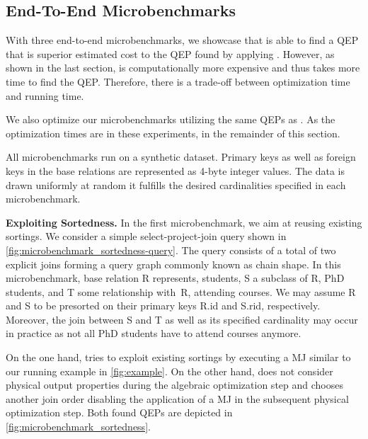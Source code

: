 \subsection{End-To-End Microbenchmarks}
\label{sec:eval-microbenchmarks}

With three end-to-end microbenchmarks, we showcase that \holistic is able to find a QEP that is superior \wrt estimated cost to the QEP found by applying \split.  However, as shown in the last section, \holistic is computationally more expensive and thus takes more time to find the QEP.  Therefore, there is a trade-off between optimization time and running time.

We also optimize our microbenchmarks utilizing   the same QEPs as \holistic.  As the optimization times are  in these experiments,  in the remainder of this section.

All microbenchmarks run on a synthetic dataset.  Primary keys as well as foreign keys in the base relations are represented as 4-byte integer values.  The data is drawn uniformly at random \sut it fulfills the desired cardinalities specified in each microbenchmark.

\textbf{Exploiting Sortedness.}
In the first microbenchmark, we aim at reusing existing sortings.  We consider a simple select-project-join query shown in \autoref{fig:microbenchmark_sortedness-query}.  The query consists of a total of two explicit joins forming a query graph commonly known as chain shape.  In this microbenchmark, base relation R represents, \eg students, S a subclass of R, \eg PhD students, and T some relationship with~R, \eg attending courses.  We may assume R and S to be presorted on their primary keys R.id and S.rid, respectively.  Moreover, the join between S and T as well as its specified cardinality may occur in practice as not all PhD students have to attend courses anymore.

On the one hand, \holistic tries to exploit existing sortings by executing a MJ similar to our running example in \autoref{fig:example}.  On the other hand, \split does not consider physical output properties during the algebraic optimization step and chooses another join order disabling the application of a MJ in the subsequent physical optimization step.  Both found QEPs are depicted in \autoref{fig:microbenchmark_sortedness}.

